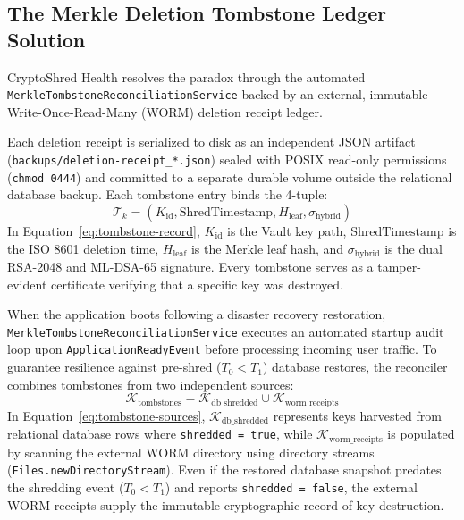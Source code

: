 \subsection{The Merkle Deletion Tombstone Ledger Solution}

CryptoShred Health resolves the paradox through the automated \texttt{MerkleTombstoneReconciliationService} backed by an external, immutable Write-Once-Read-Many (WORM) deletion receipt ledger.

Each deletion receipt is serialized to disk as an independent JSON artifact (\texttt{backups/deletion-receipt\_*.json}) sealed with POSIX read-only permissions (\texttt{chmod 0444}) and committed to a separate durable volume outside the relational database backup. Each tombstone entry binds the 4-tuple:
\begin{equation}
    \mathcal{T}_k = \left( K_{\text{id}}, \text{ShredTimestamp}, H_{\text{leaf}}, \sigma_{\text{hybrid}} \right)
    \label{eq:tombstone-record}
\end{equation}
In Equation~\ref{eq:tombstone-record}, $K_{\text{id}}$ is the Vault key path, $\text{ShredTimestamp}$ is the ISO 8601 deletion time, $H_{\text{leaf}}$ is the Merkle leaf hash, and $\sigma_{\text{hybrid}}$ is the dual RSA-2048 and ML-DSA-65 signature. Every tombstone serves as a tamper-evident certificate verifying that a specific key was destroyed.

When the application boots following a disaster recovery restoration, \texttt{MerkleTombstoneReconciliationService} executes an automated startup audit loop upon \texttt{ApplicationReadyEvent} before processing incoming user traffic. To guarantee resilience against pre-shred ($T_0 < T_1$) database restores, the reconciler combines tombstones from two independent sources:
\begin{equation}
    \mathcal{K}_{\text{tombstones}} = \mathcal{K}_{\text{db\_shredded}} \cup \mathcal{K}_{\text{worm\_receipts}}
    \label{eq:tombstone-sources}
\end{equation}
In Equation~\ref{eq:tombstone-sources}, $\mathcal{K}_{\text{db\_shredded}}$ represents keys harvested from relational database rows where \texttt{shredded = true}, while $\mathcal{K}_{\text{worm\_receipts}}$ is populated by scanning the external WORM directory using directory streams (\texttt{Files.newDirectoryStream}). Even if the restored database snapshot predates the shredding event ($T_0 < T_1$) and reports \texttt{shredded = false}, the external WORM receipts supply the immutable cryptographic record of key destruction.

